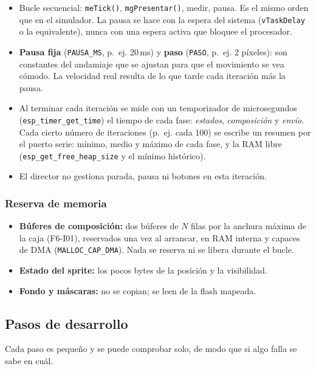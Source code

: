 \begin{itemize}
	\item Bucle secuencial: \texttt{meTick()}, \texttt{mgPresentar()}, medir, pausa. Es el mismo orden que en el simulador. La pausa se hace con la espera del sistema (\texttt{vTaskDelay} o la equivalente), nunca con una espera activa que bloquee el procesador.
	\item \textbf{Pausa fija} (\texttt{PAUSA\_MS}, p.~ej. 20\,ms) y \textbf{paso} (\texttt{PASO}, p.~ej. 2 píxeles): son constantes del andamiaje que se ajustan para que el movimiento se vea cómodo. La velocidad real resulta de lo que tarde cada iteración más la pausa.
	\item Al terminar cada iteración se mide con un temporizador de microsegundos (\texttt{esp\_timer\_get\_time}) el tiempo de cada fase: \emph{estados}, \emph{composición} y \emph{envío}. Cada cierto número de iteraciones (p.~ej. cada 100) se escribe un resumen por el puerto serie: mínimo, medio y máximo de cada fase, y la RAM libre (\texttt{esp\_get\_free\_heap\_size} y el mínimo histórico).
	\item El director no gestiona parada, pausa ni botones en esta iteración.
\end{itemize}

\subsubsection{Reserva de memoria}

\begin{itemize}
	\item \textbf{Búferes de composición:} dos búferes de $N$ filas por la anchura máxima de la caja (F6-I01), reservados una vez al arrancar, en RAM interna y capaces de DMA (\texttt{MALLOC\_CAP\_DMA}). Nada se reserva ni se libera durante el bucle.
	\item \textbf{Estado del sprite:} los pocos bytes de la posición y la visibilidad.
	\item \textbf{Fondo y máscaras:} no se copian; se leen de la flash mapeada.
\end{itemize}

\subsection{Pasos de desarrollo}
\label{sec:F6I02Pasos}

Cada paso es pequeño y se puede comprobar solo, de modo que si algo falla se sabe en cuál.

